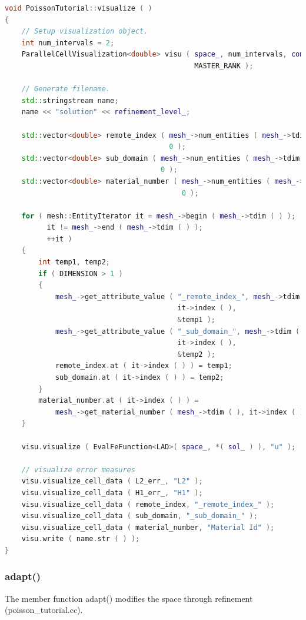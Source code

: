 \documentclass[a4paper, 11pt, twoside]{article}
\begin{document}
\begin{lstlisting}[language=C++, basicstyle={\footnotesize, \ttfamily}, keywordstyle=\color{blue}, numbers=none, tabsize=4]
void PoissonTutorial::visualize ( )
{
    // Setup visualization object.
    int num_intervals = 2;
    ParallelCellVisualization<double> visu ( space_, num_intervals, comm_, 
                                             MASTER_RANK );

    // Generate filename.
    std::stringstream name;
    name << "solution" << refinement_level_;

    std::vector<double> remote_index ( mesh_->num_entities ( mesh_->tdim ( ) ), 
                                       0 );
    std::vector<double> sub_domain ( mesh_->num_entities ( mesh_->tdim ( ) ), 
                                     0 );
    std::vector<double> material_number ( mesh_->num_entities ( mesh_->tdim ( ) ), 
                                          0 );

    for ( mesh::EntityIterator it = mesh_->begin ( mesh_->tdim ( ) );
          it != mesh_->end ( mesh_->tdim ( ) );
          ++it )
    {
        int temp1, temp2;
        if ( DIMENSION > 1 )
        {
            mesh_->get_attribute_value ( "_remote_index_", mesh_->tdim ( ),
                                         it->index ( ),
                                         &temp1 );
            mesh_->get_attribute_value ( "_sub_domain_", mesh_->tdim ( ),
                                         it->index ( ),
                                         &temp2 );
            remote_index.at ( it->index ( ) ) = temp1;
            sub_domain.at ( it->index ( ) ) = temp2;
        }
        material_number.at ( it->index ( ) ) = 
            mesh_->get_material_number ( mesh_->tdim ( ), it->index ( ) );
    }

    visu.visualize ( EvalFeFunction<LAD>( space_, *( sol_ ) ), "u" );

    // visualize error measures
    visu.visualize_cell_data ( L2_err_, "L2" );
    visu.visualize_cell_data ( H1_err_, "H1" );
    visu.visualize_cell_data ( remote_index, "_remote_index_" );
    visu.visualize_cell_data ( sub_domain, "_sub_domain_" );
    visu.visualize_cell_data ( material_number, "Material Id" );
    visu.write ( name.str ( ) );
}
\end{lstlisting}

\subsubsection{adapt()}\label{adapt}
The member function adapt() modifies the space through refinement (poisson\_tutorial.cc). 
\end{document}
